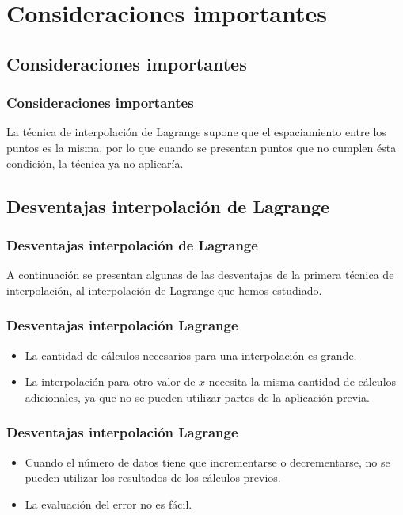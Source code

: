 \section{Consideraciones importantes}
\subsection{Consideraciones importantes}
\begin{frame}
\frametitle{Consideraciones importantes}
La técnica de interpolación de Lagrange supone que el espaciamiento entre los puntos es la misma, por lo que cuando se presentan puntos que no cumplen ésta condición, la técnica ya no aplicaría.
\end{frame}
\subsection{Desventajas interpolación de Lagrange}
\begin{frame}
\frametitle{Desventajas interpolación de Lagrange}
A continuación se presentan algunas de las desventajas de la primera técnica de interpolación, al interpolación de Lagrange que hemos estudiado.
\end{frame}
\begin{frame}
\frametitle{Desventajas interpolación Lagrange}
\begin{itemize}[<+->]
\item [\textcolor{red}{\xmark}] La cantidad de cálculos necesarios para una interpolación es grande.
\item [\textcolor{red}{\xmark}] La interpolación para otro valor de $x$ necesita la misma cantidad de cálculos adicionales, ya que no se pueden utilizar partes de la aplicación previa.
\end{itemize}
\end{frame}
\begin{frame}
\frametitle{Desventajas interpolación Lagrange}
\begin{itemize}[<+->]
\item [\textcolor{red}{\xmark}] Cuando el número de datos tiene que incrementarse o decrementarse, no se pueden utilizar los resultados de los cálculos previos.
\item [\textcolor{red}{\xmark}] La evaluación del error no es fácil.
\end{itemize}
\end{frame}
